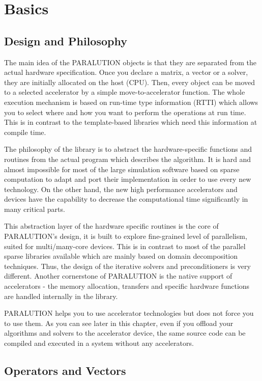\chapter{Basics}

\section{Design and Philosophy}

The main idea of the PARALUTION objects is that they are separated from the actual hardware specification. Once you declare a matrix, a vector or a solver, they are initially allocated on the host (CPU). Then, every object can be moved to a selected accelerator by a simple move-to-accelerator function. The whole execution mechanism is based on run-time type information (RTTI) which allows you to select where and how you want to perform the operations at run time. This is in contrast to the template-based libraries which need this information at compile time. 

The philosophy of the library is to abstract the hardware-specific functions and routines from the actual program which describes the algorithm. It is hard and almost impossible for most of the large simulation software based on sparse computation to adapt and port their implementation in order to use every new technology. On the other hand, the new high performance accelerators and devices have the capability to decrease the computational time significantly in many critical parts. 

This abstraction layer of the hardware specific routines is the core of PARALUTION's design, it is built to explore fine-grained level of parallelism, suited for multi/many-core devices. This is in contrast to most of the parallel sparse libraries available which are mainly based on domain decomposition techniques. Thus, the design of the iterative solvers and preconditioners is very different. Another cornerstone of PARALUTION is the native support of accelerators - the memory allocation, transfers and specific hardware functions are handled internally in the library.

PARALUTION helps you to use accelerator technologies but does not force you to use them. As you can see later in this chapter, even if you offload your algorithms and solvers to the accelerator device, the same source code can be compiled and executed in a system without any accelerators.

\section{Operators and Vectors}

